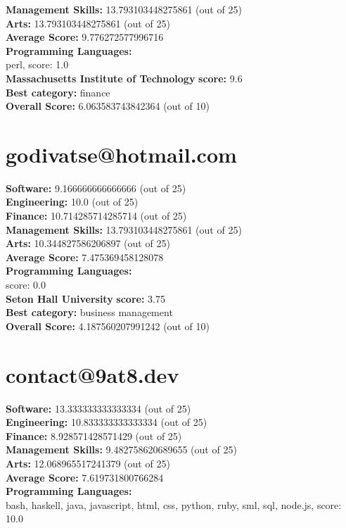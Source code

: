 \documentclass{article}
\begin{document}
\textbf{Management Skills:} 13.793103448275861 (out of 25)\\
\textbf{Arts:} 13.793103448275861 (out of 25)\\
\textbf{Average Score: } 9.776272577996716\\
\textbf{Programming Languages:} \\
perl, score: 1.0\\
\textbf{Massachusetts Institute of Technology} \textbf{score:} 9.6\\
\textbf{Best category: } finance\\
\textbf{Overall Score: }6.063583743842364 (out of 10)\section{godivatse@hotmail.com}
\textbf{Software:} 9.166666666666666 (out of 25)\\
\textbf{Engineering: } 10.0 (out of 25)\\
\textbf{Finance:} 10.714285714285714 (out of 25)\\
\textbf{Management Skills:} 13.793103448275861 (out of 25)\\
\textbf{Arts:} 10.344827586206897 (out of 25)\\
\textbf{Average Score: } 7.475369458128078\\
\textbf{Programming Languages:} \\
score: 0.0\\
\textbf{Seton Hall University} \textbf{score:} 3.75\\
\textbf{Best category: } business management\\
\textbf{Overall Score: }4.187560207991242 (out of 10)\section{​contact​@​9at8.dev}
\textbf{Software:} 13.333333333333334 (out of 25)\\
\textbf{Engineering: } 10.833333333333334 (out of 25)\\
\textbf{Finance:} 8.928571428571429 (out of 25)\\
\textbf{Management Skills:} 9.482758620689655 (out of 25)\\
\textbf{Arts:} 12.068965517241379 (out of 25)\\
\textbf{Average Score: } 7.619731800766284\\
\textbf{Programming Languages:} \\
bash, haskell, java, javascript, html, css, python, ruby, sml, sql, node.js, score: 10.0\\
\end{document}
